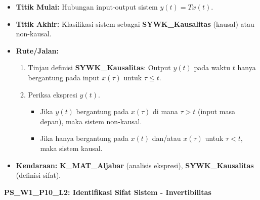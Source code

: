 \documentclass[
  letterpaper,
  DIV=11,
  numbers=noendperiod]{scrreprt}
\providecommand{\tightlist}{%
  \setlength{\itemsep}{0pt}\setlength{\parskip}{0pt}}
\begin{document}
\begin{itemize}
\tightlist
\item
  \textbf{Titik Mulai:} Hubungan input-output sistem \(y(t) = T{x(t)}\).
\item
  \textbf{Titik Akhir:} Klasifikasi sistem sebagai
  \textbf{SYWK\_Kausalitas} (kausal) atau non-kausal.
\item
  \textbf{Rute/Jalan:}

  \begin{enumerate}
  \def\labelenumi{\arabic{enumi}.}
  \tightlist
  \item
    Tinjau definisi \textbf{SYWK\_Kausalitas}: Output \(y(t)\) pada
    waktu \(t\) hanya bergantung pada input \(x(\tau)\) untuk
    \(\tau \le t\).
  \item
    Periksa ekspresi \(y(t)\).

    \begin{itemize}
    \tightlist
    \item
      Jika \(y(t)\) bergantung pada \(x(\tau)\) di mana \(\tau > t\)
      (input masa depan), maka sistem non-kausal.
    \item
      Jika hanya bergantung pada \(x(t)\) dan/atau \(x(\tau)\) untuk
      \(\tau < t\), maka sistem kausal.
    \end{itemize}
  \end{enumerate}
\item
  \textbf{Kendaraan:} \textbf{K\_MAT\_Aljabar} (analisis ekspresi),
  \textbf{SYWK\_Kausalitas} (definisi sifat).
\end{itemize}

\textbf{PS\_W1\_P10\_L2: Identifikasi Sifat Sistem - Invertibilitas}
\end{document}
